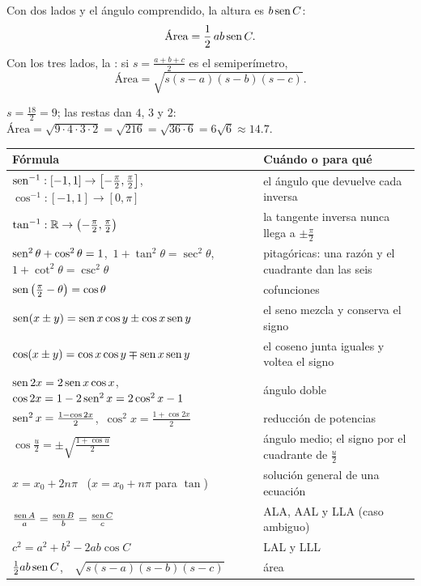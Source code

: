 \documentclass[11pt,a4paper]{article}
\begin{document}
\begin{propiedad}
Con dos lados y el ángulo comprendido, la altura es $b\operatorname{sen} C$:
\[ \text{Área}=\frac12\,ab\operatorname{sen} C. \]
Con los tres lados, la : si $s=\tfrac{a+b+c}{2}$ es el semiperímetro,
\[ \text{Área}=\sqrt{s(s-a)(s-b)(s-c)}. \]
\end{propiedad}

\begin{ejemplo}
$s=\tfrac{18}{2}=9$; las restas dan $4$, $3$ y $2$: \ $\text{Área}=\sqrt{9\cdot4\cdot3\cdot2}=\sqrt{216}=\sqrt{36\cdot6}=6\sqrt6\approx14.7$.
\end{ejemplo}

\repaso
\begin{center}
\begin{tabularx}{\linewidth}{@{}l L@{}}
\toprule
Fórmula & Cuándo o para qué\\ \midrule
$\operatorname{sen}^{-1}:[-1,1]\to\left[-\frac{\pi}{2},\frac{\pi}{2}\right]$,\ $\cos^{-1}:[-1,1]\to[0,\pi]$ & el ángulo que devuelve cada inversa\\
$\tan^{-1}:\mathbb{R}\to\left(-\frac{\pi}{2},\frac{\pi}{2}\right)$ & la tangente inversa nunca llega a $\pm\frac{\pi}{2}$\\
$\operatorname{sen}^2\theta+\cos^2\theta=1$,\ $1+\tan^2\theta=\sec^2\theta$,\ $1+\cot^2\theta=\csc^2\theta$ & pitagóricas: una razón y el cuadrante dan las seis\\
$\operatorname{sen}\left(\frac{\pi}{2}-\theta\right)=\cos\theta$ & cofunciones\\
$\operatorname{sen}(x\pm y)=\operatorname{sen} x\cos y\pm\cos x\operatorname{sen} y$ & el seno mezcla y conserva el signo\\
$\cos(x\pm y)=\cos x\cos y\mp\operatorname{sen} x\operatorname{sen} y$ & el coseno junta iguales y voltea el signo\\
$\operatorname{sen}2x=2\operatorname{sen} x\cos x$,\ $\cos2x=1-2\operatorname{sen}^2x=2\cos^2x-1$ & ángulo doble\\
$\operatorname{sen}^2x=\frac{1-\cos2x}{2}$,\ $\cos^2x=\frac{1+\cos2x}{2}$ & reducción de potencias\\
$\cos\frac u2=\pm\sqrt{\frac{1+\cos u}{2}}$ & ángulo medio; el signo por el cuadrante de $\frac u2$\\
$x=x_0+2n\pi$ \ ($x=x_0+n\pi$ para $\tan$) & solución general de una ecuación\\
$\frac{\operatorname{sen} A}{a}=\frac{\operatorname{sen} B}{b}=\frac{\operatorname{sen} C}{c}$ & ALA, AAL y LLA (caso ambiguo)\\
$c^2=a^2+b^2-2ab\cos C$ & LAL y LLL\\
$\frac12ab\operatorname{sen} C$,\ \ $\sqrt{s(s-a)(s-b)(s-c)}$ & área\\
\bottomrule
\end{tabularx}
\end{center}
\end{document}
